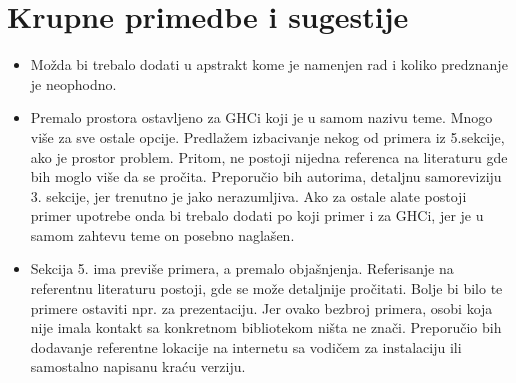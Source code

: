 \documentclass[a4paper]{report}
\begin{document}
\section{Krupne primedbe i sugestije}
\begin{itemize}
    \item Možda bi trebalo dodati u apstrakt kome je namenjen rad i koliko predznanje je neophodno.
	\item Premalo prostora ostavljeno za GHCi koji je u samom nazivu teme. Mnogo više za sve ostale opcije.
	Predlažem izbacivanje nekog od primera iz 5.sekcije, ako je prostor problem. 
	Pritom, ne postoji nijedna referenca na literaturu gde bih moglo više da se pročita.
	Preporučio bih autorima, detaljnu samoreviziju 3. sekcije, jer trenutno je jako nerazumljiva.
	Ako za ostale alate postoji primer upotrebe onda bi trebalo dodati po koji primer i za GHCi, jer je u samom zahtevu teme
	on posebno naglašen.
	\item Sekcija 5. ima previše primera, a premalo objašnjenja. Referisanje na referentnu
	literaturu postoji, gde se može detaljnije pročitati. Bolje bi bilo te primere ostaviti npr. za prezentaciju. Jer ovako 
	bezbroj primera, osobi koja nije imala kontakt sa konkretnom bibliotekom ništa ne znači.
	Preporučio bih dodavanje referentne lokacije na internetu sa vodičem za instalaciju ili samostalno napisanu kraću verziju.

\end{itemize}
\end{document}
